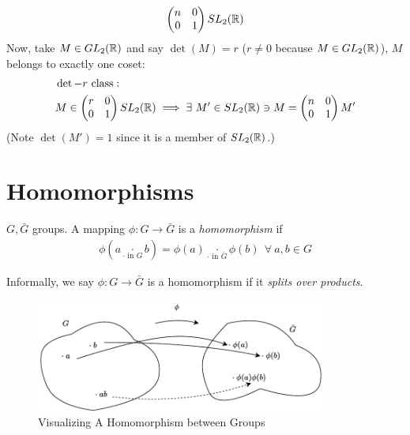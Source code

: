 \begin{example}
\begin{align}
    \begin{pmatrix}
n & 0 \\
0 & 1
\end{pmatrix}SL_2({\mathbb{ R}})\nonumber
\end{align}
Now, take $M\in GL_2({\mathbb{ R}})$ and say $\det(M)=r$ ($r\neq 0$ because $M\in GL_2({\mathbb{ R}})$), $M$ belongs to exactly one coset:
\begin{align}
    &\det-r \text{ class}:\nonumber\\
    &M\in \begin{pmatrix}
r & 0 \\
0 & 1
\end{pmatrix}SL_2({\mathbb{ R}}) \implies \exists \ M' \in SL_2({\mathbb{ R}}) \ni M= \begin{pmatrix}
n & 0 \\
0 & 1
\end{pmatrix}M'\nonumber
\end{align}
(Note $\det(M')=1$ since it is a member of  $SL_2({\mathbb{ R}})$.)
\end{example}

\section{Homomorphisms}
\begin{definition}[Homomorphism]
$G,\bar{G}$ groups. A mapping $\phi: G\rightarrow \bar{G}$ is a \textit{homomorphism} if 
\begin{align}
    \phi(a \underset{\cdot \text{ in } G}{\cdot} b)=\phi(a)\underset{\cdot \text{ in } \bar{G}}{\cdot} \phi(b) \ \ \forall \ a,b\in G \nonumber
\end{align}
\end{definition}
Informally, we say $\phi: G \rightarrow \bar{G} $ is a homomorphism if it \textit{splits over products}.
\begin{figure}[h!]
    \centering
    \includegraphics[width=0.85\textwidth]{Figures/homomorphisms_1.pdf}
    \caption{Visualizing A Homomorphism between Groups}
    \label{fig:morphism1fig}
\end{figure}

